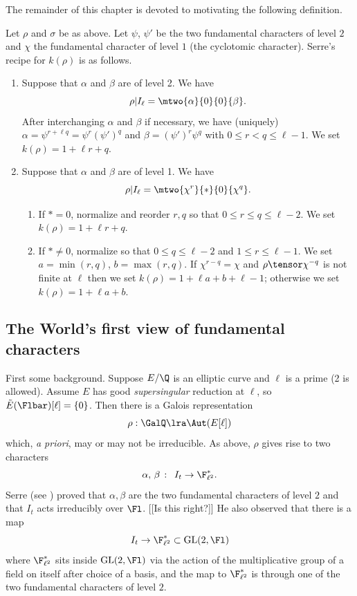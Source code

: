 \documentclass{report}
\begin{document}
The remainder of this chapter is devoted to motivating
the following definition.
\begin{defn}
Let $\rho$ and $\sigma$ be as above.
Let $\psi$, $\psi'$ be the two fundamental characters of level $2$
and $\chi$ the fundamental character of level $1$ (the cyclotomic
character).
Serre's recipe for $k(\rho)$ is as follows.
\begin{enumerate}
\item Suppose that $\alpha$ and $\beta$ are of level 2.
We have
  $$\rho|I_{\ell} = \mtwo{\alpha}{0}{0}{\beta}.$$
After interchanging $\alpha$ and $\beta$ if necessary, we
have (uniquely) $\alpha=\psi^{r+\ell q}=\psi^r(\psi')^q$ and
$\beta=(\psi')^r\psi^q$ with $0\leq r<q\leq \ell-1$.
We set $k(\rho)=1+\ell r+q$.
\item Suppose that $\alpha$ and $\beta$ are of level 1.
We have $$\rho|I_{\ell}=\mtwo{\chi^r}{*}{0}{\chi^q}.$$
\begin{enumerate}
\item If $*=0$, normalize and reorder $r,q$ so
that $0\leq r\leq q\leq \ell-2$.  We set $k(\rho)=1+\ell r + q$.
\item If $*\neq 0$, normalize so that
    $0\leq q\leq \ell-2$ and $1\leq r\leq\ell-1$.
We set $a=\min(r,q)$, $b=\max(r,q)$.  If $\chi^{r-q}=\chi$
and $\rho\tensor\chi^{-q}$ is not finite at $\ell$ then we set
$k(\rho)=1+\ell a+ b + \ell - 1$; otherwise
we set $k(\rho)=1+\ell a+ b$.
\end{enumerate}
\end{enumerate}
\end{defn}

\subsection{The World's first view of fundamental characters}
First some background.
Suppose $E/\Q$ is an elliptic curve and $\ell$ is a prime
(2 is allowed). Assume $E$ has good {\em supersingular}
reduction at $\ell$, so $\tilde{E}(\Flbar)[\ell]=\{0\}$.
Then there is a Galois representation
$$\rho:\GalQ\lra \Aut(E[\ell])$$
which, {\em a priori}, may or may not be irreducible.
As above, $\rho$ gives rise to two characters
$$\alpha,\,\beta\, :\,\ I_t\rightarrow\F_{\ell^2}^*.$$
Serre (see \cite{velu:groupes})
proved that $\alpha, \beta$ are the two fundamental characters
of level $2$ and that $I_t$ acts irreducibly over $\Fl$. [[Is
this right?]]
He also observed that there is a map
  $$I_t\rightarrow\F^*_{\ell^2}\subset\mbox{\rm GL}(2,\Fl)$$
where $\F^*_{\ell^2}$ sits inside $\mbox{\rm GL}(2,\Fl)$ via
the action of the multiplicative group of a field on
itself after choice of a basis, and the
map to $\F^*_{\ell^2}$ is through one of the two
fundamental characters of level $2$.
\end{document}
